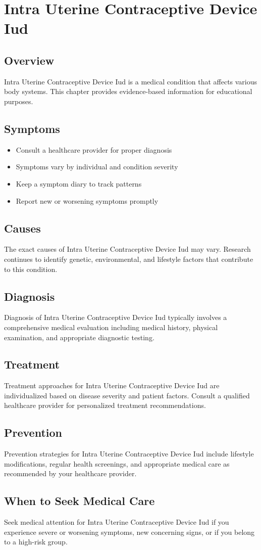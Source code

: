 \chapter{Intra Uterine Contraceptive Device Iud}

\section*{Overview}
Intra Uterine Contraceptive Device Iud is a medical condition that affects various body systems. This chapter provides evidence-based information for educational purposes.

\section*{Symptoms}
\begin{itemize}
  \item Consult a healthcare provider for proper diagnosis
  \item Symptoms vary by individual and condition severity
  \item Keep a symptom diary to track patterns
  \item Report new or worsening symptoms promptly
\end{itemize}

\section*{Causes}
The exact causes of Intra Uterine Contraceptive Device Iud may vary. Research continues to identify genetic, environmental, and lifestyle factors that contribute to this condition.

\section*{Diagnosis}
Diagnosis of Intra Uterine Contraceptive Device Iud typically involves a comprehensive medical evaluation including medical history, physical examination, and appropriate diagnostic testing.

\section*{Treatment}
Treatment approaches for Intra Uterine Contraceptive Device Iud are individualized based on disease severity and patient factors. Consult a qualified healthcare provider for personalized treatment recommendations.

\section*{Prevention}
Prevention strategies for Intra Uterine Contraceptive Device Iud include lifestyle modifications, regular health screenings, and appropriate medical care as recommended by your healthcare provider.

\section*{When to Seek Medical Care}
Seek medical attention for Intra Uterine Contraceptive Device Iud if you experience severe or worsening symptoms, new concerning signs, or if you belong to a high-risk group.
\clearpage
